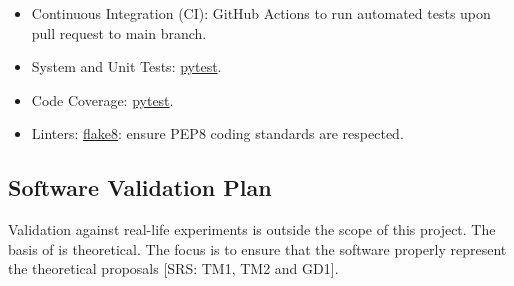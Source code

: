 \documentclass[12pt, titlepage]{article}
\begin{document}
\begin{itemize}
  \item Continuous Integration (CI): GitHub Actions to run automated tests upon pull request to main branch.
  \item System and Unit Tests: \href{https://docs.pytest.org/}{pytest}.
  \item Code Coverage: \href{https://docs.pytest.org/}{pytest}.
  \item Linters: \href{https://marketplace.visualstudio.com/items?itemName=ms-python.flake8}{flake8}: ensure PEP8 coding standards are respected.
\end{itemize}




\subsection{Software Validation Plan}

Validation against real-life experiments is outside the scope of this project. The basis of \progname{} is theoretical. The focus is to ensure that the software properly represent the theoretical proposals [SRS: TM1, TM2 and GD1].


\end{document}
